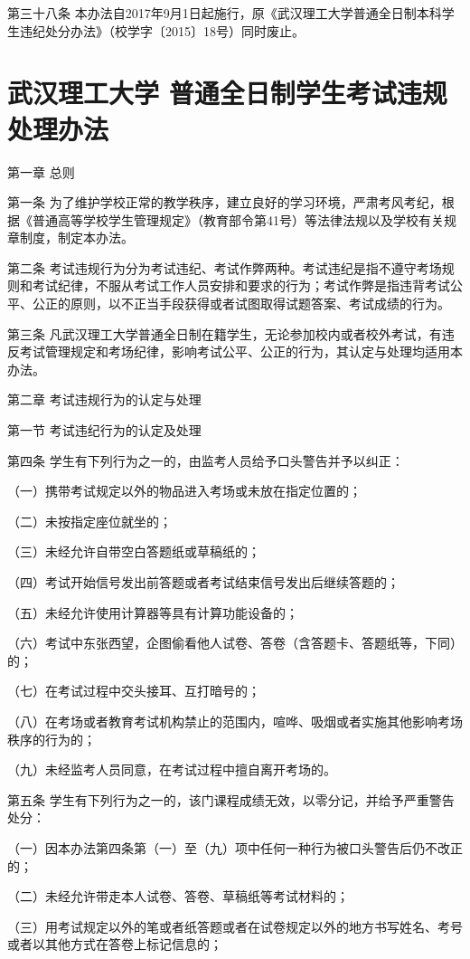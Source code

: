 \documentclass[UTF8,12pt,a4paper]{report}
\begin{document}
第三十八条  本办法自2017年9月1日起施行，原《武汉理工大学普通全日制本科学生违纪处分办法》（校学字〔2015〕18号）同时废止。

\chapter{武汉理工大学 普通全日制学生考试违规处理办法}
第一章  总则

第一条  为了维护学校正常的教学秩序，建立良好的学习环境，严肃考风考纪，根据《普通高等学校学生管理规定》（教育部令第41号）等法律法规以及学校有关规章制度，制定本办法。

第二条  考试违规行为分为考试违纪、考试作弊两种。考试违纪是指不遵守考场规则和考试纪律，不服从考试工作人员安排和要求的行为；考试作弊是指违背考试公平、公正的原则，以不正当手段获得或者试图取得试题答案、考试成绩的行为。

第三条  凡武汉理工大学普通全日制在籍学生，无论参加校内或者校外考试，有违反考试管理规定和考场纪律，影响考试公平、公正的行为，其认定与处理均适用本办法。



第二章  考试违规行为的认定与处理

第一节  考试违纪行为的认定及处理

第四条  学生有下列行为之一的，由监考人员给予口头警告并予以纠正：

（一）携带考试规定以外的物品进入考场或未放在指定位置的；

（二）未按指定座位就坐的；

（三）未经允许自带空白答题纸或草稿纸的；

（四）考试开始信号发出前答题或者考试结束信号发出后继续答题的；

（五）未经允许使用计算器等具有计算功能设备的；

（六）考试中东张西望，企图偷看他人试卷、答卷（含答题卡、答题纸等，下同）的；

（七）在考试过程中交头接耳、互打暗号的；

（八）在考场或者教育考试机构禁止的范围内，喧哗、吸烟或者实施其他影响考场秩序的行为的；

（九）未经监考人员同意，在考试过程中擅自离开考场的。

第五条  学生有下列行为之一的，该门课程成绩无效，以零分记，并给予严重警告处分：

（一）因本办法第四条第（一）至（九）项中任何一种行为被口头警告后仍不改正的；

（二）未经允许带走本人试卷、答卷、草稿纸等考试材料的；

（三）用考试规定以外的笔或者纸答题或者在试卷规定以外的地方书写姓名、考号或者以其他方式在答卷上标记信息的； 
\end{document}
